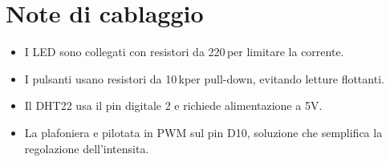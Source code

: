 \section{Note di cablaggio}
\begin{itemize}
  \item I LED sono collegati con resistori da 220\,\textohm per limitare la corrente.
  \item I pulsanti usano resistori da 10\,k\textohm per pull-down, evitando letture flottanti.
  \item Il DHT22 usa il pin digitale 2 e richiede alimentazione a 5V.
  \item La plafoniera e pilotata in PWM sul pin D10, soluzione che semplifica la regolazione dell'intensita.
\end{itemize}
